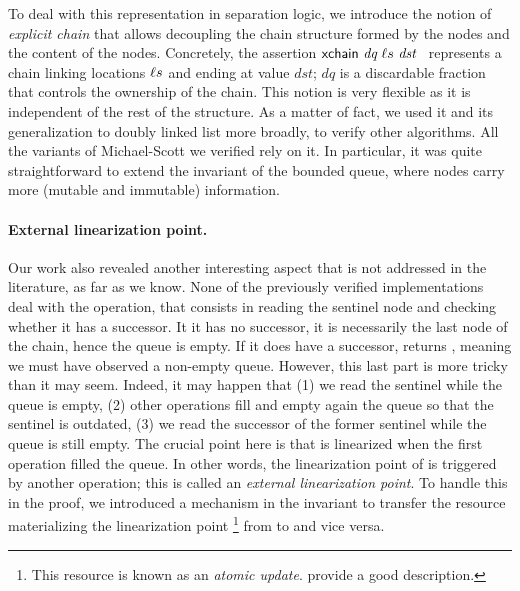 To deal with this representation in separation logic, we introduce the notion of \emph{explicit chain} that allows decoupling the chain structure formed by the nodes and the content of the nodes.
Concretely, the assertion $\textlog{xchain}\ \textit{dq}\ \loc{}s\ \textit{dst}$~ represents a chain linking locations $\ell{}s$ and ending at value $\textit{dst}$; $\textit{dq}$ is a discardable fraction~\citep{DBLP:conf/cpp/VindumB21} that controls the ownership of the chain.
This notion is very flexible as it is independent of the rest of the structure.
As a matter of fact, we used it and its generalization to doubly linked list more broadly, to verify other algorithms.
All the variants of Michael-Scott we verified rely on it.
In particular, it was quite straightforward to extend the invariant of the bounded queue, where nodes carry more (mutable and immutable) information.

\paragraph{External linearization point.}
Our work also revealed another interesting aspect that is not addressed in the literature, as far as we know.
None of the previously verified implementations deal with the  operation, that consists in reading the sentinel node and checking whether it has a successor.
It it has no successor, it is necessarily the last node of the chain, hence the queue is empty.
If it does have a successor,  returns , meaning we must have observed a non-empty queue.
However, this last part is more tricky than it may seem.
Indeed, it may happen that (1) we read the sentinel while the queue is empty, (2) other operations fill and empty again the queue so that the sentinel is outdated, (3) we read the successor of the former sentinel while the queue is still empty.
The crucial point here is that  is linearized when the first  operation filled the queue.
In other words, the linearization point of  is triggered by another operation; this is called an \emph{external linearization point}.
To handle this in the proof, we introduced a mechanism in the invariant to transfer the \Iris resource materializing the linearization point%
\footnote{
This resource is known as an \emph{atomic update}.
\citet{DBLP:journals/pacmpl/MulderK23} provide a good description.
}
from  to  and vice versa.

